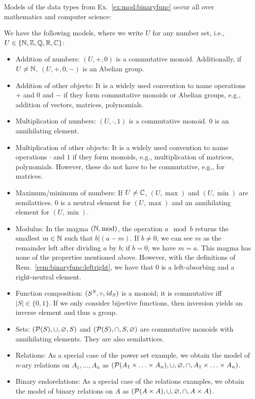Models of the data types from Ex.~\ref{ex:mod:binaryfunc} occur all over mathematics and computer science:

\begin{example}\label{ex:mod:binaryfunc:mod}
We have the following models, where we write $U$ for any number set, i.e., $U\in\{\mathbb{N},\mathbb{Z},\mathbb{Q},\mathbb{R},\mathbb{C}\}$:
\begin{itemize}
\item Addition of numbers: $(U,+,0)$ is a commutative monoid. Additionally, if $U\neq\mathbb{N}$, $(U,+,0,-)$ is an Abelian group.
\item Addition of other objects: It is a widely used convention to name operations $+$ and $0$ and $-$ if they form commutative monoids or Abelian groups, e.g., addition of vectors, matrices, polynomials.
\item Multiplication of numbers: $(U,\cdot,1)$ is a commutative monoid. $0$ is an annihilating element.
\item Multiplication of other objects: It is a widely used convention to name operations $\cdot$ and $1$ if they form monoids, e.g., multiplication of matrices, polynomials. However, these do not have to be commutative, e.g., for matrices.
\item Maximum/minimum of numbers: If $U\neq\mathbb{C}$, $(U,\max)$ and $(U,\min)$ are semilattices.
$0$ is a neutral element for $(U,\max)$ and an annihilating element for $(U,\min)$.
\item Modulus: In the magma $(\mathbb{N},\mathrm{mod})$, the operation $a\mod b$ returns the smallest $m\in\mathbb{N}$ such that $b|(a-m)$. If $b\neq 0$, we can see $m$ as the remainder left after dividing $a$ by $b$; if $b=0$, we have $m=a$. This magma has none of the properties mentioned above. However, with the definitions of Rem.~\ref{rem:binaryfunc:leftright}, we have that $0$ is a left-absorbing and a right-neutral element.
\item Function composition: $(S^S,\circ,\mathit{id}_{S})$ is a monoid; it is commutative iff $|S|\in\{0,1\}$.
If we only consider bijective functions, then inversion yields an inverse element and thus a group.
\item Sets: $(\mathcal{P}(S),\cup,\varnothing,S)$ and $(\mathcal{P}(S),\cap,S,\varnothing)$ are commutative monoids with annihilating elements. They are also semilattices.
\item Relations: As a special case of the power set example, we obtain the model of $n$-ary relations on $A_1,\ldots,A_n$ as $(\mathcal{P}(A_1\times\ldots\times A_n),\cup,\varnothing,\cap,A_1\times\ldots\times A_n)$.
\item Binary endorelations: As a special case of the relations examples, we obtain the model of binary relations on $A$ as $(\mathcal{P}(A\times A),\cup,\varnothing,\cap,A\times A)$.

\end{itemize}
\end{example}
